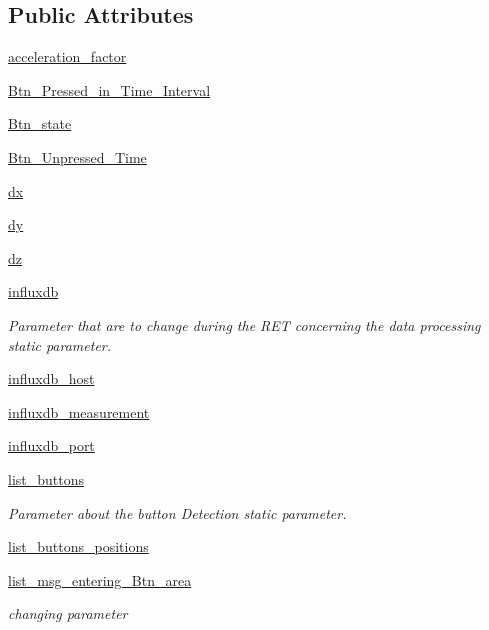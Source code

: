 \subsection*{Public Attributes}
\begin{DoxyCompactItemize}
\item 
\hyperlink{a00037_abd224cfc80b136898df89af7812fa8d5}{acceleration\+\_\+factor}
\item 
\hyperlink{a00037_a73222c92f422e37740aa524320dd3b66}{Btn\+\_\+\+Pressed\+\_\+in\+\_\+\+Time\+\_\+\+Interval}
\item 
\hyperlink{a00037_aa7a64d5a735fcdbe65ff3dd6f55e4ac3}{Btn\+\_\+state}
\item 
\hyperlink{a00037_a7863230eddd33d64211a89a31cecb827}{Btn\+\_\+\+Unpressed\+\_\+\+Time}
\item 
\hyperlink{a00037_aacddc911cdfe5cd5ec97b084754542d4}{dx}
\item 
\hyperlink{a00037_a22b1a06ae09d552a5ca668a07885ebf1}{dy}
\item 
\hyperlink{a00037_a71f0caccd6959b358543ee9cdc9b9c3e}{dz}
\item 
\hyperlink{a00037_a034f595b48aad7217bd228d3620eaca8}{influxdb}
\begin{DoxyCompactList}\small\item\em Parameter that are to change during the R\+ET concerning the data processing static parameter. \end{DoxyCompactList}\item 
\hyperlink{a00037_a2c910a8a000ce837b18cf2959297dcce}{influxdb\+\_\+host}
\item 
\hyperlink{a00037_a2951333e048b79a878571eafd1eee541}{influxdb\+\_\+measurement}
\item 
\hyperlink{a00037_a0d892e15d9fa78818d4495560d962ec2}{influxdb\+\_\+port}
\item 
\hyperlink{a00037_a50ea04db981a8afa82086a60a58ae466}{list\+\_\+buttons}
\begin{DoxyCompactList}\small\item\em Parameter about the button Detection static parameter. \end{DoxyCompactList}\item 
\hyperlink{a00037_ae07c53483c9c3ff8611ec4d7401fa71f}{list\+\_\+buttons\+\_\+positions}
\item 
\hyperlink{a00037_a1d89a275c67888d70d61831fede7b2c1}{list\+\_\+msg\+\_\+entering\+\_\+\+Btn\+\_\+area}
\begin{DoxyCompactList}\small\item\em changing parameter \end{DoxyCompactList}\item 

\end{DoxyCompactItemize}
